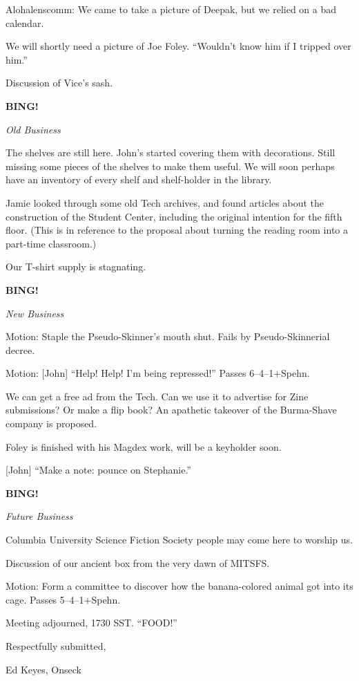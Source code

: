 \documentclass[12pt]{article}
\newcommand{\bing}{{\bf BING!} }
\newcommand{\goto}[1]{\bing \vskip 12pt \centerline{{\em{#1}}}}
\begin{document}
Alohalenscomm: We came to take a picture of Deepak, but we relied
on a bad calendar.

We will shortly need a picture of Joe Foley.  ``Wouldn't know him
if I tripped over him.''

Discussion of Vice's sash.

\goto{Old Business}

The shelves are still here.  John's started covering them with
decorations.  Still missing some pieces of the shelves to make them
useful.  We will soon perhaps have an inventory of every shelf and
shelf-holder in the library.

Jamie looked through some old Tech archives, and found articles
about the construction of the Student Center, including the original
intention for the fifth floor.  (This is in reference to the proposal
about turning the reading room into a part-time classroom.)

Our T-shirt supply is stagnating.

\goto{New Business}

Motion: Staple the Pseudo-Skinner's mouth shut.  Fails by
Pseudo-Skinnerial decree.

Motion: [John] ``Help!  Help!  I'm being repressed!''  Passes 6--4--1+Spehn.

We can get a free ad from the Tech.  Can we use it to advertise for
Zine submissions?  Or make a flip book?  An apathetic takeover of the
Burma-Shave company is proposed.

Foley is finished with his Magdex work, will be a keyholder soon.

[John] ``Make a note: pounce on Stephanie.''

\goto{Future Business}

Columbia University Science Fiction Society people may come here
to worship us.

Discussion of our ancient box from the very dawn of MITSFS.

Motion: Form a committee to discover how the banana-colored animal
got into its cage.  Passes 5--4--1+Spehn.

\vspace{12pt}

\noindent
Meeting adjourned, 1730 SST.  ``FOOD!''

\vspace{18pt}

\centerline{Respectfully submitted,}
\centerline{Ed Keyes, Onseck}
\end{document}
